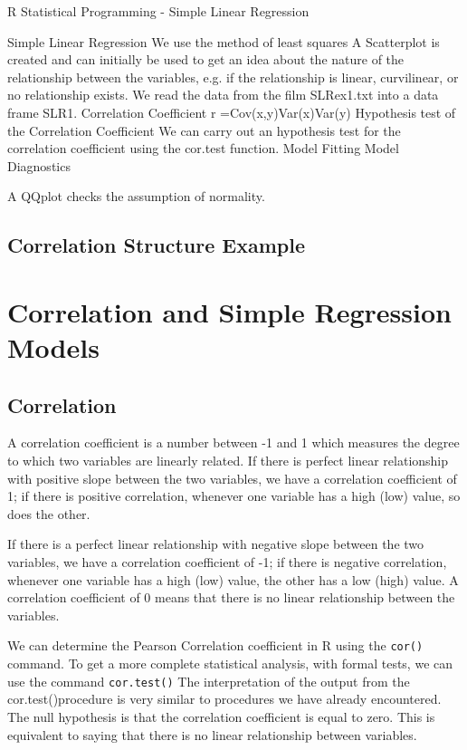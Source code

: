 R Statistical Programming - Simple Linear Regression
 
Simple Linear Regression
We use the method of least squares
A Scatterplot is created and can initially be used to get an idea
about the nature of the relationship between the variables, e.g. if the
relationship is linear, curvilinear, or no relationship exists.
We read the data from the film SLRex1.txt into a data frame SLR1.
Correlation Coefficient
r =Cov(x,y)Var(x)Var(y)
Hypothesis test of the Correlation Coefficient
We can carry out an hypothesis test for the correlation coefficient
using the cor.test function.
Model Fitting
Model Diagnostics
 
A QQplot checks the assumption of normality.
 


\subsection{Correlation Structure Example}


\newpage
\section{Correlation and Simple Regression Models}

\subsection{Correlation}

A correlation coefficient is a number between -1 and 1 which measures the degree to which two variables are linearly related. If there is perfect linear relationship with positive slope between the two variables, we have a correlation coefficient of 1; if there is positive correlation, whenever one variable has a high (low) value, so does the other.

If there is a perfect linear relationship with negative slope between the two variables, we have a correlation coefficient of -1; if there is negative correlation, whenever one variable has a high (low) value, the other has a low (high) value.
A correlation coefficient of 0 means that there is no linear relationship between the variables.

We can determine the Pearson Correlation coefficient in R using the \texttt{cor()} command.
To get a more complete statistical analysis, with formal tests, we can use the command \texttt{cor.test()}
The interpretation of the output from the cor.test()procedure is very similar to procedures we have already encountered. The null hypothesis is that the correlation coefficient is equal to zero. This is equivalent to saying that there is no linear relationship between variables.


